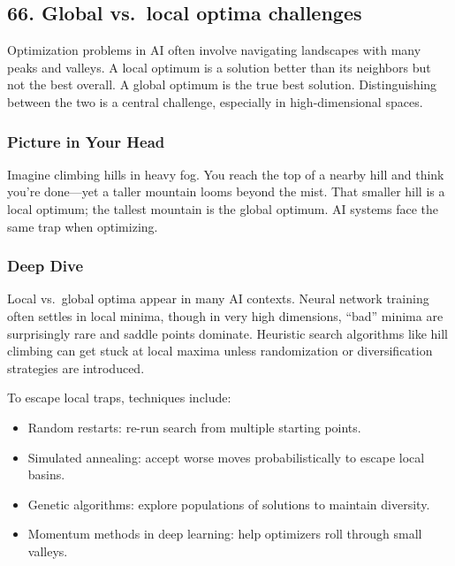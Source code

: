 \documentclass[
  letterpaper,
  DIV=11,
  numbers=noendperiod]{scrreprt}
\providecommand{\tightlist}{%
  \setlength{\itemsep}{0pt}\setlength{\parskip}{0pt}}
\begin{document}
\subsection{66. Global vs.~local optima
challenges}\label{global-vs.-local-optima-challenges}

Optimization problems in AI often involve navigating landscapes with
many peaks and valleys. A local optimum is a solution better than its
neighbors but not the best overall. A global optimum is the true best
solution. Distinguishing between the two is a central challenge,
especially in high-dimensional spaces.

\subsubsection{Picture in Your Head}\label{picture-in-your-head-65}

Imagine climbing hills in heavy fog. You reach the top of a nearby hill
and think you're done---yet a taller mountain looms beyond the mist.
That smaller hill is a local optimum; the tallest mountain is the global
optimum. AI systems face the same trap when optimizing.

\subsubsection{Deep Dive}\label{deep-dive-65}

Local vs.~global optima appear in many AI contexts. Neural network
training often settles in local minima, though in very high dimensions,
``bad'' minima are surprisingly rare and saddle points dominate.
Heuristic search algorithms like hill climbing can get stuck at local
maxima unless randomization or diversification strategies are
introduced.

To escape local traps, techniques include:

\begin{itemize}
\tightlist
\item
  Random restarts: re-run search from multiple starting points.
\item
  Simulated annealing: accept worse moves probabilistically to escape
  local basins.
\item
  Genetic algorithms: explore populations of solutions to maintain
  diversity.
\item
  Momentum methods in deep learning: help optimizers roll through small
  valleys.
\end{itemize}
\end{document}
